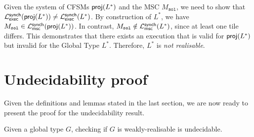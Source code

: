 Given the system of CFSMs $\mathsf{proj}(L^*)$ and the MSC  
$M_{\texttt{sol}}$, we need to show that  
$\mathcal{L}_{\mathsf{exec}}^{\mathsf{synch}}(\mathsf{proj}(L^*)) \neq \mathcal{L}_{\mathsf{exec}}^{\mathsf{synch}}(L^*)$.  
By construction of $L^*$, we have  
$M_{\texttt{sol}} \in \mathcal{L}_{\mathsf{msc}}^{\mathsf{synch}}(\mathsf{proj}(L^*))$.  
In contrast, $M_{\texttt{sol}} \notin  
\mathcal{L}_{\mathsf{msc}}^{\mathsf{synch}}(L^*)$, since at least one tile differs.  
This demonstrates that there exists an execution that is valid for  
$\mathsf{proj}(L^*)$ but invalid for the Global Type $L^*$.  
Therefore, $L^*$ is \emph{not realisable}.  


\section{Undecidability proof}

Given the definitions and lemmas stated in the last section, we are now ready
to present the proof for the undecidability result.

\bigskip

\begin{theorem}\label{thm:main}
	Given a global type $G$, checking if $G$ is weakly-realisable is undecidable.
\end{theorem}

